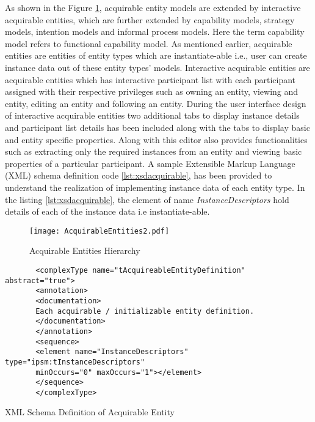 As shown in the Figure \ref{fig:acquirableentities2}, acquirable entity models are extended by interactive acquirable entities, which are further extended by capability models, strategy models, intention models and informal process models. Here the term capability model refers to functional capability model. As mentioned earlier, acquirable entities are entities of entity types which are instantiate-able i.e., user can create instance data out of these entity types' models. Interactive acquirable entities are acquirable entities which has interactive participant list with each participant assigned with their respective privileges such as owning an entity, viewing and entity, editing an entity and following an entity. During the user interface design of interactive acquirable entities two additional tabs to display instance details and participant list details has been included along with the tabs to display basic and entity specific properties. Along with this editor also provides functionalities such as extracting only the required instances from an entity and viewing basic properties of a particular participant. A sample Extensible Markup Language (XML) schema definition code \ref{lst:xsdacquirable}, has been provided to understand the realization of implementing instance data of each entity type. In the listing \ref{lst:xsdacquirable}, the element of name \textit{InstanceDescriptors} hold details of each of the instance data i.e instantiate-able. 

\begin{figure}
	\centering
	\texttt{[image: AcquirableEntities2.pdf]}
	\caption{Acquirable Entities Hierarchy}
	\label{fig:acquirableentities2}
\end{figure}

\begin{Listing}
	\begin{lstlisting}
	   <complexType name="tAcquireableEntityDefinition" abstract="true">
	   <annotation>
	   <documentation>
	   Each acquirable / initializable entity definition.
	   </documentation>
	   </annotation>
	   <sequence>
	   <element name="InstanceDescriptors" type="ipsm:tInstanceDescriptors"
	   minOccurs="0" maxOccurs="1"></element>
	   </sequence>
	   </complexType>
		\end{lstlisting}
		\caption{XML Schema Definition of Acquirable Entity}
		\label{lst:xsdacquirable}
\end{Listing}

